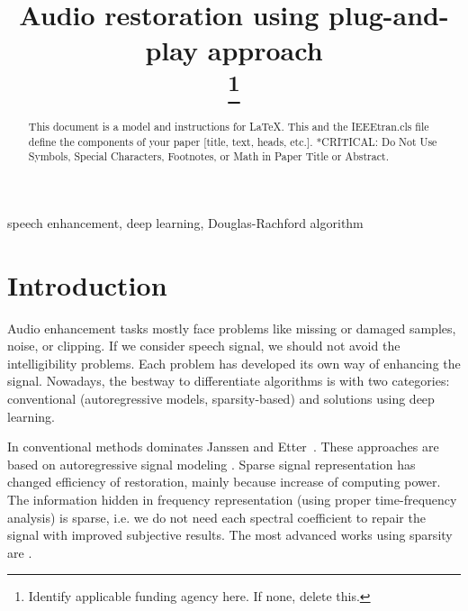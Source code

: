 \documentclass[conference]{IEEEtran}
\begin{document}
\title{Audio restoration using plug-and-play approach\\
{}
\thanks{Identify applicable funding agency here. If none, delete this.}
}

\author{
\and
{}

}

\maketitle

\begin{abstract}
This document is a model and instructions for \LaTeX.
This and the IEEEtran.cls file define the components of your paper [title, text, heads, etc.]. *CRITICAL: Do Not Use Symbols, Special Characters, Footnotes, 
or Math in Paper Title or Abstract.
\end{abstract}

\begin{IEEEkeywords}
speech enhancement, deep learning, Douglas-Rachford algorithm
\end{IEEEkeywords}

\section{Introduction}

Audio enhancement tasks mostly face problems like missing or damaged samples, noise, or clipping.
If we consider speech signal, we should not avoid the intelligibility problems.
Each problem has developed its own way of enhancing the signal.
Nowadays, the bestway to differentiate algorithms is with two categories:
conventional (autoregressive models, sparsity-based) and solutions using deep learning.

In conventional methods dominates Janssen \cite{Janssen1986} and Etter~\cite{Etter1996}.
These approaches are based on autoregressive signal modeling \cite{Mokry2020}.
Sparse signal representation has changed efficiency of restoration, mainly because increase of computing power.
The information hidden in frequency representation (using proper time-frequency analysis) is sparse, i.e. we do not need each spectral coefficient to repair the signal with improved subjective results.
The most advanced works using sparsity are \cite{Adler2012,Kitic2015,Zaviska2019, Mokry2019}.
\end{document}
